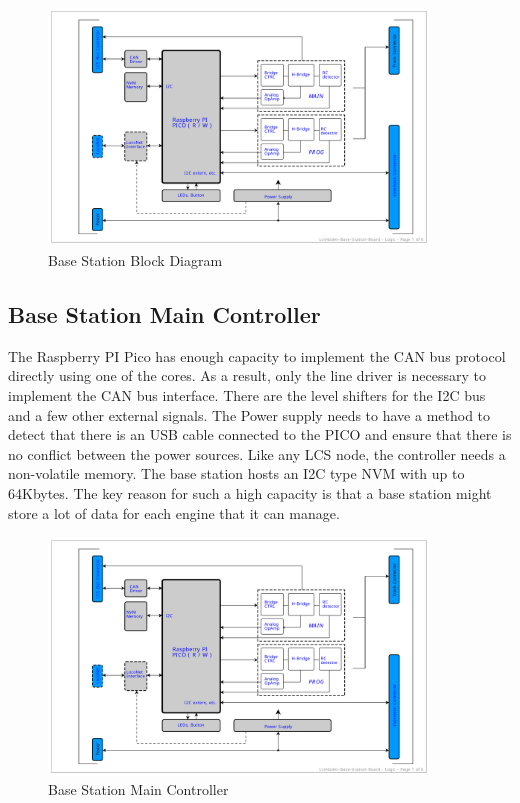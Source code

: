 \begin{figure}[htbp]
    \centering
    \includegraphics[page=1, width=0.9\textwidth]{./Schematics/Schematic_LcsNodes-Base-Station-Board.pdf}
    \caption{Base Station Block Diagram}
    \label{fig:Block Diagram}
\end{figure}

\subsection{Base Station Main Controller}

The Raspberry PI Pico has enough capacity to implement the CAN bus protocol directly using one of the cores. As a result, only the line driver is necessary to implement the CAN bus interface. There are the level shifters for the I2C bus and a few other external signals. The Power supply needs to have a method to detect that there is an USB cable connected to the PICO and ensure that there is no conflict between the power sources. Like any LCS node, the controller needs a non-volatile memory. The base station hosts an I2C type NVM with up to 64Kbytes. The key reason for such a high capacity is that a base station might store a lot of data for each engine that it can manage.

\begin{figure}[htbp]
    \centering
    \includegraphics[page=2, width=0.9\textwidth]{./Schematics/Schematic_LcsNodes-Base-Station-Board.pdf}
    \caption{Base Station Main Controller}
\end{figure}

